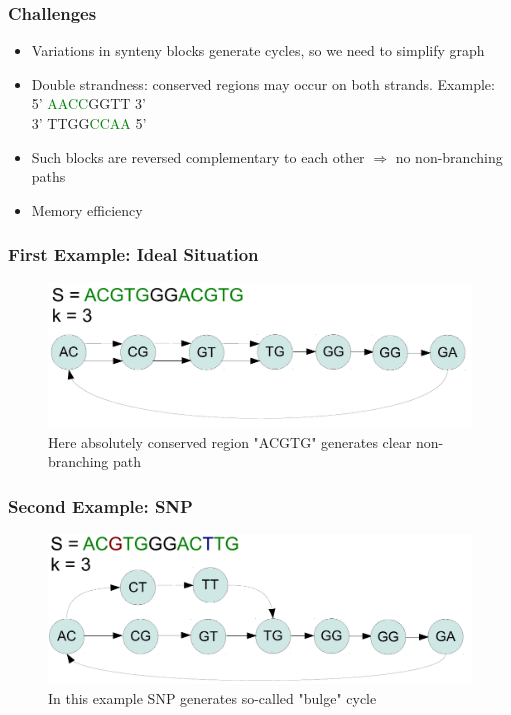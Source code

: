 \documentclass[svgnames,14pt]{beamer}
\begin{document}
\begin{frame}
\frametitle{Challenges}
\begin{itemize}
\item Variations in synteny blocks generate cycles, so we need to simplify graph
\item Double strandness: conserved regions may occur on both strands. Example: \\
5' \textcolor{Green}{AACC}GGTT 3' \\
3' TTGG\textcolor{Green}{CCAA} 5'
\item Such blocks are reversed complementary to each other \( \Rightarrow \) no non-branching paths
\item Memory efficiency
\end{itemize}
\end{frame}

\begin{frame}
\frametitle{First Example: Ideal Situation}
\begin{figure}
\centering
\includegraphics[scale = 0.60]{Figure3.pdf}
\small \caption{Here absolutely conserved region "ACGTG" generates clear non-branching path}
\end{figure}
\end{frame}

\begin{frame}
\frametitle{Second Example: SNP}
\begin{figure}
\centering
\includegraphics[scale = 0.60]{Figure4.pdf}
\small \caption{In this example SNP generates so-called "bulge" cycle}
\end{figure}
\end{frame}
\end{document}
